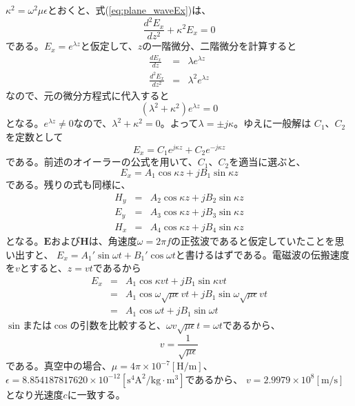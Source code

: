$\kappa^2=\omega^2\mu\epsilon$とおくと、式(\ref{eq:plane_waveEx})は、
\[
\frac{d^2E_x}{dz^2} + \kappa^2 E_x = 0
\]
である。$E_x=e^{\lambda z}$と仮定して、$z$の一階微分、二階微分を計算すると
\begin{eqnarray*}
\frac{dE_x}{dz} &=& \lambda e^{\lambda z}\\
\frac{d^2E_x}{dz^2} &=& \lambda^2 e^{\lambda z}
\end{eqnarray*}
なので、元の微分方程式に代入すると
\[
(\lambda^2 + \kappa^2)e^{\lambda z} = 0
\]
となる。$e^{\lambda z} \neq 0$なので、$\lambda^2 + \kappa^2 = 0$。よって$\lambda=\pm j\kappa$。ゆえに一般解は
$C_1$、$C_2$を定数として
\[
E_x = C_1 e^{j\kappa z} + C_2 e^{-j\kappa z}
\]
である。前述のオイーラーの公式を用いて、$C_1$、$C_2$を適当に選ぶと、
\begin{equation}
E_x = A_1\cos\kappa z + jB_1\sin\kappa z
\end{equation}
である。残りの式も同様に、
\begin{eqnarray}
H_y &=& A_2\cos\kappa z + jB_2\sin\kappa z \\
E_y &=& A_3\cos\kappa z + jB_3\sin\kappa z \\
H_x &=& A_4\cos\kappa z + jB_4\sin\kappa z
\end{eqnarray}
となる。$\bm{E}$および$\bm{H}$は、角速度$\omega = 2\pi f$の正弦波であると仮定していたことを思い出すと、
$E_x = A_1'\sin \omega t + B_1' \cos \omega t$と書けるはずである。電磁波の伝搬速度を$v$とすると、$z=vt$であるから
\begin{eqnarray*}
E_x &=& A_1\cos \kappa vt + jB_1 \sin \kappa vt \\
&=& A_1\cos \omega \sqrt{\mu \epsilon}vt + jB_1\sin \omega \sqrt{\mu \epsilon}vt\\
&=&  A_1\cos \omega t + jB_1 \sin \omega t
\end{eqnarray*}
$\sin$または$\cos$の引数を比較すると、$\omega v\sqrt{\mu \epsilon} t= \omega t$であるから、
\begin{equation}
v = \frac{1}{\sqrt{\mu \epsilon}}
\end{equation}
である。真空中の場合、$\mu = 4\pi \times 10^{-7}\mathrm{[H/m]}$、$\epsilon =8.854187817620 \times 10^{-12} \mathrm{[s^4A^2/kg\cdot m^3]}$であるから、
$v=2.9979\times 10^8 \mathrm{[m/s]}$となり光速度$c$に一致する。

